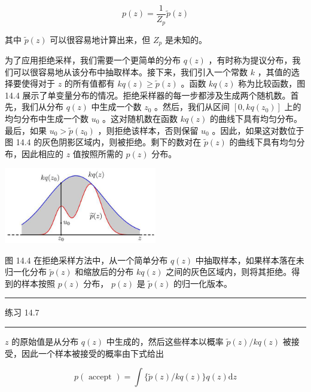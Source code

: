 \documentclass[10pt]{report}
\newcommand{\HRule}{\begin{center}\rule{0.9\linewidth}{0.2mm}\end{center}}
\begin{document}
\[
p\left( z\right)  = \frac{1}{{Z}_{p}}\widetilde{p}\left( z\right)  \tag{14.13}
\]

其中 \(\widetilde{p}\left( z\right)\) 可以很容易地计算出来，但 \({Z}_{p}\) 是未知的。

为了应用拒绝采样，我们需要一个更简单的分布 \(q\left( z\right)\) ，有时称为提议分布，我们可以很容易地从该分布中抽取样本。接下来，我们引入一个常数 \(k\) ，其值的选择要使得对于 \(z\) 的所有值都有 \({kq}\left( z\right)  \geq  \widetilde{p}\left( z\right)\) 。函数 \({kq}\left( z\right)\) 称为比较函数，图 14.4 展示了单变量分布的情况。拒绝采样器的每一步都涉及生成两个随机数。首先，我们从分布 \(q\left( z\right)\) 中生成一个数 \({z}_{0}\) 。然后，我们从区间 \(\left\lbrack  {0,{kq}\left( {z}_{0}\right) }\right\rbrack\) 上的均匀分布中生成一个数 \({u}_{0}\) 。这对随机数在函数 \({kq}\left( z\right)\) 的曲线下具有均匀分布。最后，如果 \({u}_{0} > \widetilde{p}\left( {z}_{0}\right)\) ，则拒绝该样本，否则保留 \({u}_{0}\) 。因此，如果这对数位于图 14.4 的灰色阴影区域内，则被拒绝。剩下的数对在 \(\widetilde{p}\left( z\right)\) 的曲线下具有均匀分布，因此相应的 \(z\) 值按照所需的 \(p\left( z\right)\) 分布。

\begin{center}
\includegraphics[max width=0.5\textwidth]{images/0194e279-9b28-703a-88f4-c3ac21e2010d_453_896_342_657_328_0.jpg}
\end{center}
\hspace*{3em} 

图 14.4 在拒绝采样方法中，从一个简单分布 \(q\left( z\right)\) 中抽取样本，如果样本落在未归一化分布 \(\widetilde{p}\left( z\right)\) 和缩放后的分布 \({kq}\left( z\right)\) 之间的灰色区域内，则将其拒绝。得到的样本按照 \(p\left( z\right)\) 分布， \(p\left( z\right)\) 是 \(\widetilde{p}\left( z\right)\) 的归一化版本。

\HRule

练习 14.7

\HRule

\(z\) 的原始值是从分布 \(q\left( z\right)\) 中生成的，然后这些样本以概率 \(\widetilde{p}\left( z\right) /{kq}\left( z\right)\) 被接受，因此一个样本被接受的概率由下式给出

\[
p\left( \text{ accept }\right)  = \int \{ \widetilde{p}\left( z\right) /{kq}\left( z\right) \} q\left( z\right) \mathrm{d}z
\]
\end{document}
